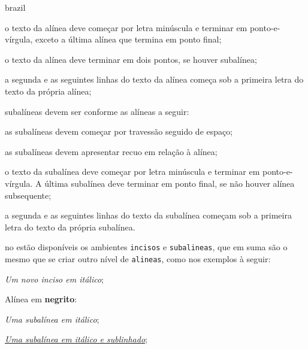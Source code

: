 \begin{otherlanguage*}{brazil}
\begin{alineas}
  \item o texto da alínea deve começar por letra minúscula e terminar em
  ponto-e-vírgula, exceto a última alínea que termina em ponto final;

  \item o texto da alínea deve terminar em dois pontos, se houver subalínea;

  \item a segunda e as seguintes linhas do texto da alínea começa sob a
  primeira letra do texto da própria alínea;

  \item subalíneas \cite[4.3]{NBR6024:2012} devem ser conforme as alíneas a
  seguir:

  \begin{alineas}
     \item as subalíneas devem começar por travessão seguido de espaço;

     \item as subalíneas devem apresentar recuo em relação à alínea;

     \item o texto da subalínea deve começar por letra minúscula e terminar em
     ponto-e-vírgula. A última subalínea deve terminar em ponto final, se não
     houver alínea subsequente;

     \item a segunda e as seguintes linhas do texto da subalínea começam sob a
     primeira letra do texto da própria subalínea.
  \end{alineas}

  \item no \abnTeX{} estão disponíveis os ambientes \texttt{incisos} e
  \texttt{subalineas}, que em suma são o mesmo que se criar outro nível de
  \texttt{alineas}, como nos exemplos à seguir:

  \begin{incisos}
    \item \textit{Um novo inciso em itálico};
  \end{incisos}

  \item Alínea em \textbf{negrito}:

  \begin{subalineas}
    \item \textit{Uma subalínea em itálico};
    \item \underline{\textit{Uma subalínea em itálico e sublinhado}};
  \end{subalineas}


\end{alineas}
\end{otherlanguage*}
